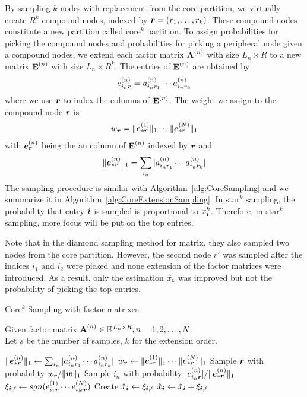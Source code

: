 \documentclass[letterpaper]{article}
\newcommand{\Sca}[3]{{#1}^{(#2)}_{i_#2#3}}%
\newcommand{\anr}[2]{\Sca{a}{#1}{#2}}
\newcommand{\enr}[2]{\Sca{e}{#1}{\V{#2}}}
\newcommand{\score}[1]{\xi_{\V{i},#1}}
\newcommand{\V}[1]{{\boldsymbol{{\MakeLowercase{#1}}}}}
\newcommand{\ColVec}[3]{\V{#1}^{(#2)}_{#3}}
\newcommand{\NormColE}[2]{\norm{\ColVec{e}{#1}{*\V{#2}}}{1}}
\newcommand{\coord}{(i_1,i_2,\ldots,i_N)}
\newcommand{\predx}{\hat{x}_{\V{i}}}
\newcommand{\M}[1]{{\textbf{{\MakeUppercase{#1}}}}}
\newcommand{\FacMat}[2]{\M{#1}^{(#2)}}
\newcommand{\norm}[2]{\|#1\|_{#2}}
\newcommand{\Alg}[1]{Algorithm~\ref{alg:#1}}
\begin{document}
By sampling $k$ nodes with replacement from the core partition, we virtually create $R^k$ compound nodes, indexed by $\V{r}=(r_1,\ldots,r_k)$. These compound nodes constitute a new partition called core$^k$ partition. To assign probabilities for picking the compound nodes and probabilities for picking a peripheral node given a compound nodes, we extend each factor matrix $\FacMat{A}{n}$ with size $L_n\times R$ to a new matrix $\M{E}^{(n)}$ with size $L_n\times R^k$. The entries of $\M{E}^{(n)}$ are obtained by
\begin{align}
\enr{n}{r} = \anr{n}{r_1}\cdots\anr{n}{r_k}
\end{align}
where we use $\V{r}$ to index the columns of $\M{E}^{(n)}$. The weight we assign to the compound node $\V{r}$ is
\begin{align}
w_{\V{r}} = \NormColE{1}{r}\cdots\NormColE{N}{r}
\end{align}
with $\V{e}_{\V{r}}^{(n)}$ being the an column of $\M{E}^{(n)}$ indexed by $\V{r}$ and
\begin{align}
\NormColE{n}{r} = \sum_{i_n}|\anr{n}{r_1}\cdots\anr{n}{r_k}|
\end{align}
The sampling procedure is similar with \Alg{CoreSampling} 
and we summarize it in \Alg{CoreExtensionSampling}. 
In star$^k$ sampling, 
the probability that entry $\V{i}$ is sampled is proportional to $x_{\V{i}}^k$. 
Therefore, in star$^k$ sampling, more focus will be put on the top entries.

Note that in the diamond sampling method for matrix, 
they also sampled two nodes from the core partition. 
However, the second node $r'$ was sampled after the indices $i_1$ and $i_2$ were picked 
and none extension of the factor matrices were introduced. 
As a result, only the estimation $\predx$ was improved 
but not the probability of picking the top entries.

\begin{algorithm}[ht]
    \caption{Core$^k$ Sampling with factor matrixes}
    \label{alg:CoreExtensionSampling}
    Given factor matrix $\FacMat{A}{n}\in \mathbb{R}^{L_n\times R}, n = 1,2,\ldots,N$.\\
    Let $s$ be the number of samples, $k$ for the extension order.
    \begin{algorithmic}[1]
    \For{$\V{r}\in{\underbrace{R\times \cdots \times R}_{k}}$}
    \State $\NormColE{n}{r} \leftarrow \sum_{i_n}|\anr{n}{r_1}\cdots\anr{n}{r_k}|$
    \EndFor
    \State $w_{\V{r}} \leftarrow \NormColE{1}{r} \cdots \NormColE{N}{r} $
    \EndFor
    \State Sample $\V{r}$ with probability $w_\V{r}/\norm{\V{W}}{1}$
    \label{line:nodes}
    \State Sample $i_n$ with probability $|\enr{n}{r}|/\NormColE{n}{r}$
    \EndFor
    \State
        $\score{\ell} \leftarrow sgn(\enr{1}{r}\cdots\enr{N}{r})$
    \If {$\V{i}=\coord$ has not been sampled}
    \State  Create $\predx \leftarrow \score{\ell} $
    \Else
    \State $\predx \leftarrow \predx + \score{\ell}$
    \EndIf
    \EndFor
    \end{algorithmic}
\end{algorithm}
\end{document}
